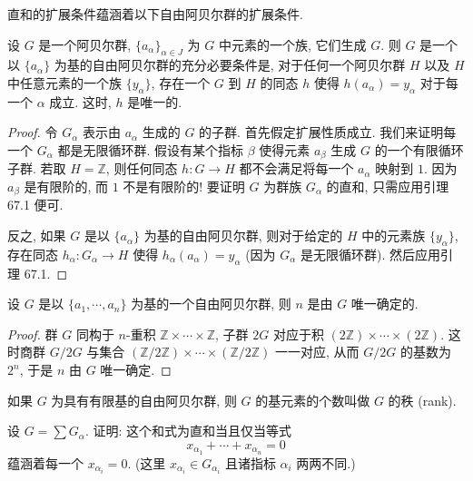 直和的扩展条件蕴涵着以下自由阿贝尔群的扩展条件.

\begin{lemma}\label{ch11:lemma-free-abelian-extension}
设 $G$ 是一个阿贝尔群, $\{a_{\alpha}\}_{\alpha\in J}$ 为 $G$ 中元素的一个族, 它们生成 $G$. 则 $G$ 是一个以 $\{a_{\alpha}\}$ 为基的自由阿贝尔群的充分必要条件是, 对于任何一个阿贝尔群 $H$ 以及 $H$ 中任意元素的一个族 $\{y_{\alpha}\}$, 存在一个 $G$ 到 $H$ 的同态 $h$ 使得 $h(a_{\alpha})=y_{\alpha}$ 对于每一个 $\alpha$ 成立. 这时, $h$ 是唯一的.
\end{lemma}

\begin{proof}
令 $G_{\alpha}$ 表示由 $a_{\alpha}$ 生成的 $G$ 的子群. 首先假定扩展性质成立. 我们来证明每一个 $G_{\alpha}$ 都是无限循环群. 假设有某个指标 $\beta$ 使得元素 $a_{\beta}$ 生成 $G$ 的一个有限循环子群. 若取 $H=\mathbb{Z}$, 则任何同态 $h\colon G\to H$ 都不会满足将每一个 $a_{\alpha}$ 映射到 $1$. 因为 $a_{\beta}$ 是有限阶的, 而 $1$ 不是有限阶的! 要证明 $G$ 为群族 $G_{\alpha}$ 的直和, 只需应用引理 67.1 便可.

反之, 如果 $G$ 是以 $\{a_{\alpha}\}$ 为基的自由阿贝尔群, 则对于给定的 $H$ 中的元素族 $\{y_{\alpha}\}$, 存在同态 $h_{\alpha}\colon G_{\alpha}\to H$ 使得 $h_{\alpha}(a_{\alpha})=y_{\alpha}$ (因为 $G_{\alpha}$ 是无限循环群). 然后应用引理 67.1.
\end{proof}

\begin{theorem}\label{ch11:thm-rank-well-defined}
设 $G$ 是以 $\{a_{1},\cdots,a_{n}\}$ 为基的一个自由阿贝尔群, 则 $n$ 是由 $G$ 唯一确定的.
\end{theorem}

\begin{proof}
群 $G$ 同构于 $n$-重积 $\mathbb{Z}\times\cdots\times\mathbb{Z}$, 子群 $2G$ 对应于积 $(2\mathbb{Z})\times\cdots\times(2\mathbb{Z})$. 这时商群 $G/2G$ 与集合 $(\mathbb{Z}/2\mathbb{Z})\times\cdots\times(\mathbb{Z}/2\mathbb{Z})$ 一一对应, 从而 $G/2G$ 的基数为 $2^{n}$, 于是 $n$ 由 $G$ 唯一确定.
\end{proof}

如果 $G$ 为具有有限基的自由阿贝尔群, 则 $G$ 的基元素的个数叫做 $G$ 的秩 (rank).

\begin{exercise}\label{ch11:ex-direct-sum-1}
设 $G=\sum G_{\alpha}$. 证明: 这个和式为直和当且仅当等式
\[
x_{\alpha_{1}}+\cdots+x_{\alpha_{n}}=0
\]
蕴涵着每一个 $x_{\alpha_{i}}=0$. (这里 $x_{\alpha_{i}}\in G_{\alpha_{i}}$ 且诸指标 $\alpha_{i}$ 两两不同.)
\end{exercise}

